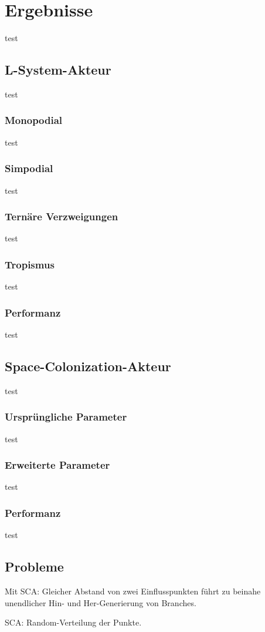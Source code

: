 \chapter{Ergebnisse}
test
\section{L-System-Akteur}
test
\subsection{Monopodial}
test
\subsection{Simpodial}
test
\subsection{Ternäre Verzweigungen}
test
\subsection{Tropismus}
test
\subsection{Performanz}
test
\section{Space-Colonization-Akteur}
test
\subsection{Ursprüngliche Parameter}
test
\subsection{Erweiterte Parameter}
test
\subsection{Performanz}
test

\section{Probleme}

Mit SCA: Gleicher Abstand von zwei Einflusspunkten führt zu beinahe unendlicher Hin- und Her-Generierung von Branches.

SCA: Random-Verteilung der Punkte.